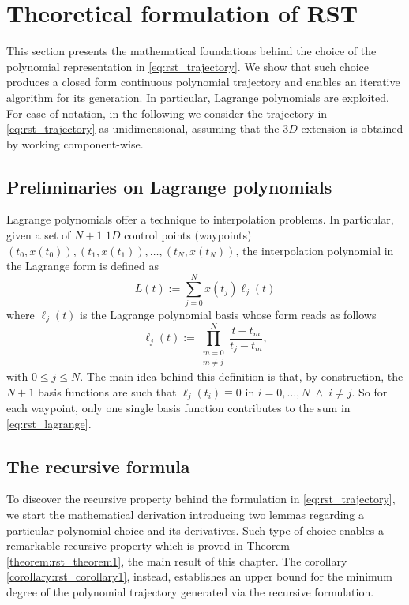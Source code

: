 \section{Theoretical formulation of RST}
\label{subsec:rst_results}
This section presents the mathematical foundations behind the choice of the polynomial representation in \eqref{eq:rst_trajectory}. We show that such choice produces a closed form continuous polynomial trajectory and enables an iterative algorithm for its generation. In particular, Lagrange polynomials are exploited. For ease of notation, in the following we consider the trajectory in \eqref{eq:rst_trajectory} as unidimensional, assuming that the $3D$ extension is obtained by working component-wise.%
\subsection{Preliminaries on Lagrange polynomials}
\label{subsec:rst_Lagrange}
Lagrange polynomials offer a technique to interpolation problems. In particular, given a set of $N+1$ $1D$ control points (waypoints) $(t_0,x(t_0)), (t_1,x(t_1)), \dots, (t_N,x(t_N))$, the interpolation polynomial in the Lagrange form is defined as
\begin{equation}
\label{eq:rst_lagrange}
L(t) := \sum_{j=0}^{N}{x(t_j) \ell_j(t)}
\end{equation}
where $\ell_j(t)$ is the Lagrange polynomial basis whose form reads as follows
\begin{equation}
\ell_j(t):= \prod_{\substack{m=0 \\ m\neq j}}^{N}{\frac{t-t_m}{t_j-t_m}},
\end{equation}
with $0\leq j\leq N$. The main idea behind this definition is that, by construction, the $N+1$ basis functions are such that $\ell_j(t_i)\equiv 0$ in $i=0,\dots,N \; \wedge \; i\neq j$. So for each waypoint, only one single basis function contributes to the sum in \eqref{eq:rst_lagrange}.

\subsection{The recursive formula}
To discover the recursive property behind the formulation in \eqref{eq:rst_trajectory}, we start the mathematical derivation introducing two lemmas regarding a particular polynomial choice and its derivatives. Such type of choice enables a remarkable recursive property which is proved in Theorem \ref{theorem:rst_theorem1}, the main result of this chapter. The corollary \ref{corollary:rst_corollary1}, instead, establishes an upper bound for the minimum degree of the polynomial trajectory generated via the recursive formulation.

